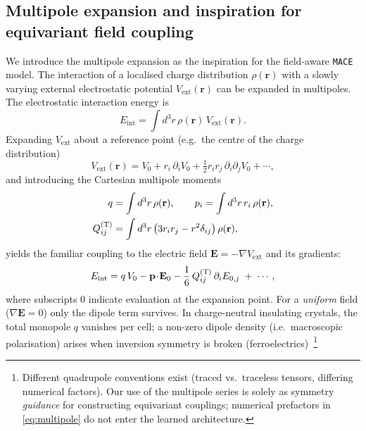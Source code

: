 \documentclass[aps,physrev,graphicx,amsmath,amssymb,
               reprint,superscriptaddress]{revtex4-2}
\begin{document}
\subsection{Multipole expansion and inspiration for equivariant field coupling}
We introduce the multipole expansion as the inspiration for the field-aware \texttt{MACE} model. The interaction of a localised charge distribution $\rho(\mathbf r)$ with a slowly varying external electrostatic potential $V_\text{ext}(\mathbf r)$ can be expanded in multipoles.
The electrostatic interaction energy is
\begin{equation}
E_\text{int}=\int d^3r\,\rho(\mathbf r)\,V_\text{ext}(\mathbf r).
\end{equation}
Expanding $V_\text{ext}$ about a reference point (e.g.\ the centre of the charge distribution)
\begin{equation}
V_\text{ext}(\mathbf r)=V_0 + r_i\,\partial_i V_0 + \tfrac12 r_i r_j\,\partial_i\partial_j V_0 + \cdots,
\end{equation}
and introducing the Cartesian multipole moments
\begin{align}
q &= \int d^3r\,\rho(\mathbf r),\qquad
p_i = \int d^3r\,r_i\,\rho(\mathbf r), \\
Q_{ij}^{(\rm T)} &= \int d^3r\,\big(3 r_i r_j - r^2\delta_{ij}\big)\,\rho(\mathbf r),
\end{align}
yields the familiar coupling to the electric field $\mathbf E=-\nabla V_\text{ext}$ and its gradients:
\begin{equation}
E_\text{int} = q\,V_0 - \mathbf p\!\cdot\!\mathbf E_0
-\frac{1}{6}\,Q_{ij}^{(\rm T)}\,\partial_i E_{0,j} \; + \; \cdots,
\label{eq:multipole}
\end{equation}
where subscripts $0$ indicate evaluation at the expansion point.
For a \emph{uniform} field ($\nabla\mathbf E=0$) only the dipole term survives.
In charge-neutral insulating crystals, the total monopole $q$ vanishes per cell; a non-zero dipole density (i.e.\ macroscopic polarisation) arises when inversion symmetry is broken (ferroelectrics)~\footnote{Different quadrupole conventions exist (traced vs.\ traceless tensors, differing numerical factors). Our use of the multipole series is solely as symmetry \emph{guidance} for constructing equivariant couplings; numerical prefactors in \eqref{eq:multipole} do not enter the learned architecture.}
\end{document}
